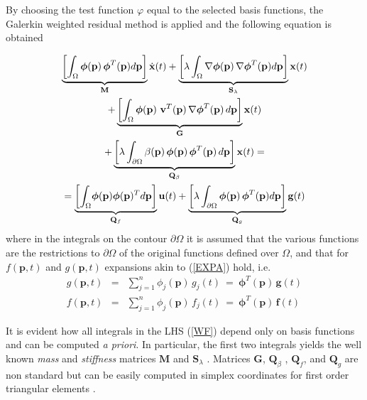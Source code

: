\documentclass[journal]{IEEEtran}
\newcommand{\mb}{\mathbf}
\newcommand{\bs}{\boldsymbol}
\begin{document}
	By choosing the test function $\varphi$ equal to the selected basis functions, the Galerkin
	weighted residual method is applied and the following equation is obtained
	\cite{Pelosi09}
	
	\begin{multline} \label{WF}
	\small{\underbrace{\left[ \int_\Omega  
			\bs{\phi}(\mb{p}) \,\bs{\phi}^T(\mb{p}) d\mb{p} 
			\right]}_{\mb{M}} \dot{\mb{x}}(t)  + 
		\underbrace{\left[ \lambda \int_\Omega 
			\nabla	\bs{\phi}(\mb{p}) \,\nabla \bs{\phi}^T(\mb{p}) d\mb{p} 
			\right]}_{\mb{S}_\lambda} \mb{x}(t) }\\
\small{+ \underbrace{\left[ \int_\Omega 
			\bs{\phi}(\mb{p}) ~ \mb{v}^T(\mb{p}) \,\nabla \bs{\phi}^T(\mb{p}) \, d\mb{p} 
			\right]}_{\mb{G}} \mb{x}(t) }
		\\
	\small{+ \underbrace{\left[ \lambda \int_{\partial \Omega} 
			\beta(\mb{p}) \, \bs{\phi}(\mb{p}) \,\bs{\phi}^T(\mb{p}) \, d\mb{p}
			\right]}_{\mb{Q}_\beta} \mb{x}(t) = }\\
	=  \small{\underbrace{\left[\displaystyle{\int_\Omega} \bs{\phi}(\mb{p})
			\bs{\phi}(\mb{p})^T d\mb{p}	\right]}_{\mb{Q}_f} {\mb{u}}(t) 
		+  \underbrace{\left[ \lambda \int_{\partial \Omega} 
			\bs{\phi}(\mb{p}) \,\bs{\phi}^T(\mb{p}) d\mb{p}
			\right] }_{\mb{Q}_g} {\mb{g}}(t) }
	\end{multline} 
	where in the integrals on the contour $\partial \Omega$ it is assumed that
	the various functions are the restrictions to $\partial \Omega$ of the original
	functions defined over $\Omega$, and that for $f(\mb{p},t)$ and $g(\mb{p},t)$
	expansions akin to (\ref{EXPA}) hold, i.e.
	\begin{eqnarray*}g(\mb{p},t) &=& \sum_{j=1}^{n} \phi_{j}(\mb{p}) \,  g_j(t) ~=~
	\boldsymbol{\phi}^T(\mb{p}) \, {\mb{g}}(t) \\
	f(\mb{p},t) &=& \sum_{j=1}^{n} \phi_{j}(\mb{p}) \, f_j(t) ~=~
	\boldsymbol{\phi}^T(\mb{p}) \, {\mb{f}}(t) 
	\end{eqnarray*}
	
	It is evident how all integrals in the LHS (\ref{WF}) depend only on basis functions
	and can be computed {\em a priori}. 
	In particular, the first two integrals yields the well known \textit{mass} and
	\textit{stiffness} matrices $\mb{M}$ and $\mb{S}_\lambda$ \cite{Pelosi09}.
	Matrices $\mb{G}$, $\mb{Q}_\beta$ , $\mb{Q}_f$, and $\mb{Q}_g$
	are non standard but can be easily computed in simplex coordinates for first
	order triangular elements \cite{Pelosi09,Silv96}.
	
\end{document}
